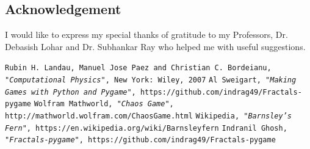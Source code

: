 \documentclass[a0,portrait]{a0poster}
\begin{document}
\begin{multicols}{3}
\color{Black} %






\subsection*{Acknowledgement}
I would like to express my special thanks of gratitude to my Professors, Dr. Debasish Lohar and Dr. Subhankar Ray who helped me with useful  suggestions.

\begin{thebibliography}{10}
\texttt{Rubin H. Landau, Manuel Jose Paez and Christian C. Bordeianu, \textit{"Computational Physics"}, New York: Wiley, 2007}
\texttt{Al Sweigart, \textit{"Making Games with Python and Pygame"}, https://github.com/indrag49/Fractals-pygame}
\texttt{Wolfram Mathworld, \textit{"Chaos Game"}, http://mathworld.wolfram.com/ChaosGame.html}
\texttt{Wikipedia, \textit{"Barnsley's Fern"}, https://en.wikipedia.org/wiki/Barnsleyfern}
\texttt{Indranil Ghosh, \textit{"Fractals-pygame"}, https://github.com/indrag49/Fractals-pygame}
\end{thebibliography}

\end{multicols}
\end{document}
